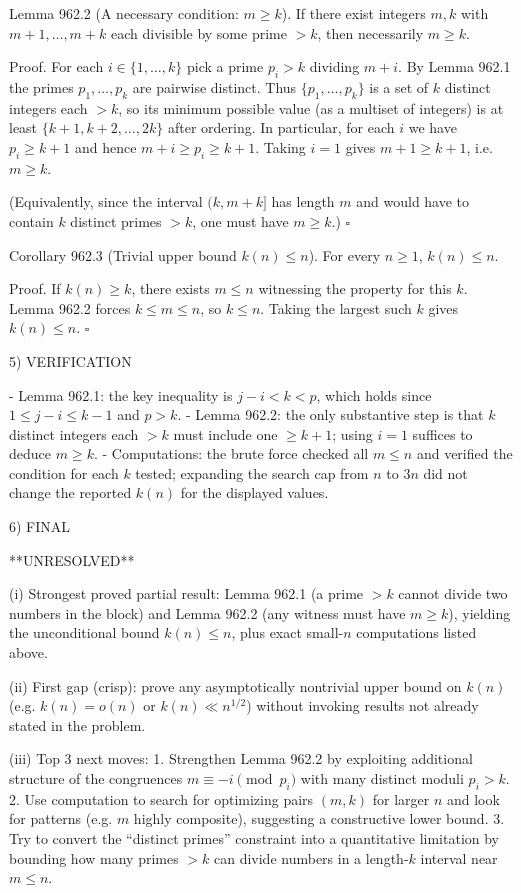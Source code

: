 Lemma 962.2 (A necessary condition: $m\ge k$).
If there exist integers $m,k$ with $m+1,\dots,m+k$ each divisible by some prime $>k$, then necessarily $m\ge k$.

Proof.
For each $i\in\{1,\dots,k\}$ pick a prime $p_i>k$ dividing $m+i$. By Lemma 962.1 the primes $p_1,\dots,p_k$ are pairwise distinct. Thus $\{p_1,\dots,p_k\}$ is a set of $k$ distinct integers each $>k$, so its minimum possible value (as a multiset of integers) is at least $\{k+1,k+2,\dots,2k\}$ after ordering. In particular, for each $i$ we have $p_i\ge k+1$ and hence $m+i\ge p_i\ge k+1$. Taking $i=1$ gives $m+1\ge k+1$, i.e. $m\ge k$.

(Equivalently, since the interval $(k,m+k]$ has length $m$ and would have to contain $k$ distinct primes $>k$, one must have $m\ge k$.) $\square$

Corollary 962.3 (Trivial upper bound $k(n)\le n$).
For every $n\ge 1$, $k(n)\le n$.

Proof.
If $k(n)\ge k$, there exists $m\le n$ witnessing the property for this $k$. Lemma 962.2 forces $k\le m\le n$, so $k\le n$. Taking the largest such $k$ gives $k(n)\le n$. $\square$

5) VERIFICATION

- Lemma 962.1: the key inequality is $j-i<k<p$, which holds since $1\le j-i\le k-1$ and $p>k$.
- Lemma 962.2: the only substantive step is that $k$ distinct integers each $>k$ must include one $\ge k+1$; using $i=1$ suffices to deduce $m\ge k$.
- Computations: the brute force checked all $m\le n$ and verified the condition for each $k$ tested; expanding the search cap from $n$ to $3n$ did not change the reported $k(n)$ for the displayed values.

6) FINAL

**UNRESOLVED**

(i) Strongest proved partial result: Lemma 962.1 (a prime $>k$ cannot divide two numbers in the block) and Lemma 962.2 (any witness must have $m\ge k$), yielding the unconditional bound $k(n)\le n$, plus exact small-$n$ computations listed above.

(ii) First gap (crisp): prove any asymptotically nontrivial upper bound on $k(n)$ (e.g. $k(n)=o(n)$ or $k(n)\ll n^{1/2}$) without invoking results not already stated in the problem.

(iii) Top 3 next moves:
1. Strengthen Lemma 962.2 by exploiting additional structure of the congruences $m\equiv -i\pmod{p_i}$ with many distinct moduli $p_i>k$.
2. Use computation to search for optimizing pairs $(m,k)$ for larger $n$ and look for patterns (e.g. $m$ highly composite), suggesting a constructive lower bound.
3. Try to convert the “distinct primes” constraint into a quantitative limitation by bounding how many primes $>k$ can divide numbers in a length-$k$ interval near $m\le n$.

